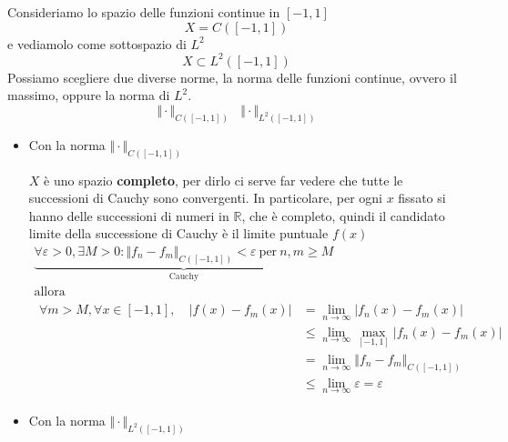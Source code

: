 \documentclass[10pt,a4paper,twoside,openright]{book}
\begin{document}
Consideriamo lo spazio delle funzioni continue in $\displaystyle [ -1,1]$
\begin{equation*}
    X=C([ -1,1])
\end{equation*}
e vediamolo come sottospazio di $\displaystyle L^{2}$
\begin{equation*}
    X\subset L^{2}([ -1,1])
\end{equation*}
Possiamo scegliere due diverse norme, la norma delle funzioni continue, ovvero il massimo, oppure la norma di $\displaystyle L^{2}$.
\begin{equation*}
    \Vert \cdotp \Vert _{C([ -1,1])} \ \ \ \ \Vert \cdotp \Vert _{L^{2}([ -1,1])}
\end{equation*}
\begin{itemize}
    \item Con la norma $\displaystyle \Vert \cdotp \Vert _{C([ -1,1])}$

          $X$ è uno spazio \textbf{completo}, per dirlo ci serve far vedere che tutte le successioni di Cauchy sono convergenti. In particolare, per ogni $x$ fissato si hanno delle successioni di numeri in $\displaystyle \mathbb{R}$, che è completo, quindi il candidato limite della successione di Cauchy è il limite puntuale $\displaystyle f(x)$
          \begin{gather*}
              \underbrace{\forall \varepsilon  >0,\exists M >0:\Vert f_{n} -f_{m}\Vert _{C([ -1,1])} < \varepsilon \ \text{per} \ n,m\geqslant M}_{\text{Cauchy}}\\
              \text{allora}\\
              \begin{aligned}
                  \forall m >M,\forall x\in [ -1,1],\quad |f(x) -f_{m}(x) | & =\lim _{n\rightarrow \infty } |f_{n}(x) -f_{m}(x) |                        \\
                                                                            & \leqslant \lim _{n\rightarrow \infty }\max_{[ -1,1]} |f_{n}(x) -f_{m}(x) | \\
                                                                            & =\lim _{n\rightarrow \infty }\Vert f_{n} -f_{m}\Vert _{C([ -1,1])}         \\
                                                                            & \leqslant \lim _{n\rightarrow \infty } \varepsilon =\varepsilon
              \end{aligned}
          \end{gather*}
    \item Con la norma $\displaystyle \Vert \cdotp \Vert _{L^{2}([ -1,1])}$


\end{itemize}
\end{document}
